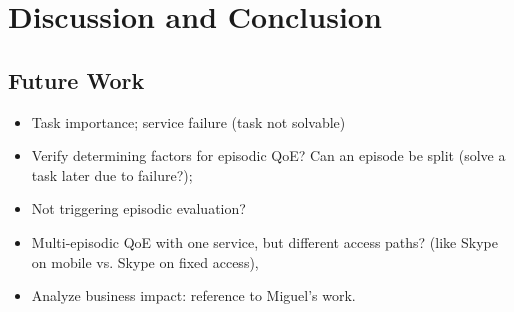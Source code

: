 \chapter{Discussion and Conclusion}\label{chap:discussion}
%

\section{Future Work}
\begin{itemize}
\item Task importance; service failure (task not solvable)
\item Verify determining factors for episodic QoE? Can an episode be split (solve a task later due to failure?);
\item Not triggering episodic evaluation?
\item Multi-episodic QoE with one service, but different access paths? (like Skype on mobile vs. Skype on fixed access), 

\item Analyze business impact: reference to Miguel's work.
\end{itemize}